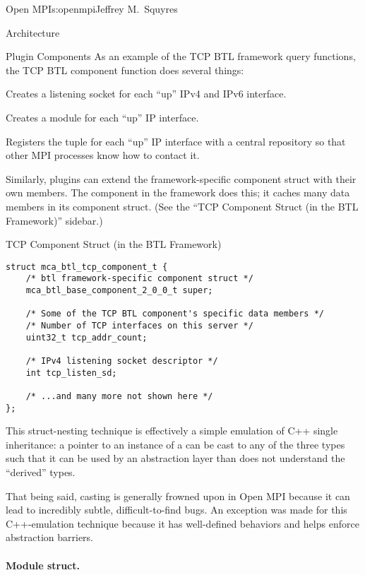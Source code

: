 \begin{aosachapter}{Open MPI}{s:openmpi}{Jeffrey M.\ Squyres}
\begin{aosasect1}{Architecture}
\begin{aosasect2}{Plugin Components}
As an example of the TCP BTL framework query functions, the TCP BTL
component  function does several things:
\begin{aosaitemize}
\item Creates a listening socket for each ``up'' IPv4 and IPv6 interface.
\item Creates a module for each ``up'' IP interface.
\item Registers the tuple  for each ``up'' IP
  interface with a central repository so that other MPI processes know
  how to contact it.
\end{aosaitemize}

Similarly, plugins can extend the framework-specific component struct
with their own members.
%
The  component in the  framework does this; it
caches many data members in its component struct. (See the ``TCP
Component Struct (in the BTL Framework)'' sidebar.)

\begin{aosabox}{TCP Component Struct (in the BTL Framework)}
\begin{verbatim}
struct mca_btl_tcp_component_t {
    /* btl framework-specific component struct */ 
    mca_btl_base_component_2_0_0_t super;

    /* Some of the TCP BTL component's specific data members */
    /* Number of TCP interfaces on this server */
    uint32_t tcp_addr_count;
    
    /* IPv4 listening socket descriptor */
    int tcp_listen_sd;

    /* ...and many more not shown here */
};
\end{verbatim}
\end{aosabox}

This struct-nesting technique is effectively a simple emulation of C++
single inheritance: a pointer to an instance of a  can be cast to any of the
three types such that it can be used by an abstraction layer than does
not understand the ``derived'' types.

That being said, casting is generally frowned upon in Open MPI because
it can lead to incredibly subtle, difficult-to-find bugs.  
%
An exception was made for this C++-emulation technique because it has
well-defined behaviors and helps enforce abstraction barriers.


\paragraph{Module struct.}


\end{aosasect2}
\end{aosasect1}
\end{aosachapter}
